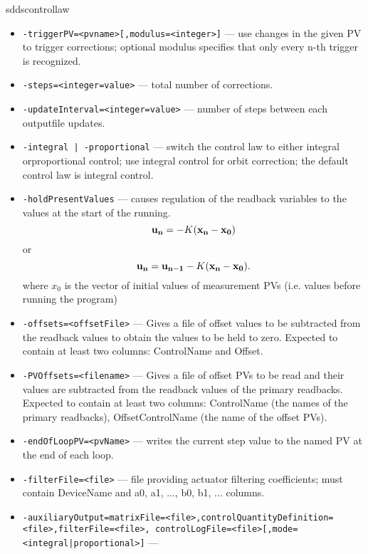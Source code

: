 \begin{sddsprog}{sddscontrollaw}
\begin{itemize}
  \item {\tt -triggerPV=<pvname>[,modulus=<integer>]} --- use changes in the given PV to trigger corrections; optional modulus specifies that only every n-th trigger is recognized.
  \item {\tt -steps=<integer=value>} ---  total number of corrections.
  \item {\tt -updateInterval=<integer=value>} --- number of steps between each outputfile updates.
  \item {\tt -integral | -proportional} ---
               switch the control law to either integral orproportional
               control;  use integral control for orbit correction;
               the default control law is integral control.
  \item {\tt -holdPresentValues} ---
               causes regulation of the readback variables to the
               values at the start of the running.
\begin{equation}
{\bf u_n} = - K ({\bf x_n} - {\bf x_0})
\end{equation}
or
\begin{equation}
{\bf u_n} = {\bf u_{n-1}} - K ({\bf x_n} - {\bf x_0}).
\end{equation}
where $x_0$ is the vector of initial values of measurement PVs (i.e. values before running the program)
  \item {\tt -offsets=<offsetFile>} --- Gives a file of offset values to be subtracted from the
               readback values to obtain the values to be held to zero.
               Expected to contain at least two columns: ControlName and Offset.
  \item {\tt -PVOffsets=<filename>} --- Gives a file of offset PVs to be read and their values are
               subtracted from the readback values of the primary readbacks.
               Expected to contain at least two columns: ControlName (the names
               of the primary readbacks), OffsetControlName (the name of
               the offset PVs).
  \item {\tt -endOfLoopPV=<pvName>} --- writes the current step value to the named PV at the end of each loop.
  \item {\tt -filterFile=<file>} --- file providing actuator filtering coefficients; must contain DeviceName and a0, a1, ..., b0, b1, ... columns.
  \item {\tt -auxiliaryOutput=matrixFile=<file>,controlQuantityDefinition=<file>,filterFile=<file>,
      controlLogFile=<file>[,mode=<integral|proportional>]} ---

\end{itemize}
\end{sddsprog}
